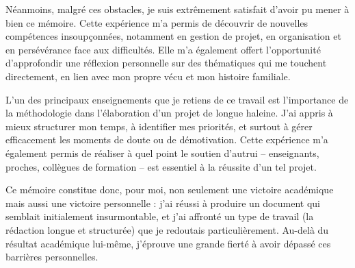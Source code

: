 \documentclass[11pt,a4paper]{report}
\begin{document}
Néanmoins, malgré ces obstacles, je suis extrêmement satisfait d’avoir pu mener à bien ce mémoire. Cette expérience m’a permis de découvrir de nouvelles compétences insoupçonnées, notamment en gestion de projet, en organisation et en persévérance face aux difficultés. Elle m’a également offert l’opportunité d’approfondir une réflexion personnelle sur des thématiques qui me touchent directement, en lien avec mon propre vécu et mon histoire familiale.

L’un des principaux enseignements que je retiens de ce travail est l’importance de la méthodologie dans l’élaboration d’un projet de longue haleine. J’ai appris à mieux structurer mon temps, à identifier mes priorités, et surtout à gérer efficacement les moments de doute ou de démotivation. Cette expérience m’a également permis de réaliser à quel point le soutien d’autrui – enseignants, proches, collègues de formation – est essentiel à la réussite d’un tel projet.

Ce mémoire constitue donc, pour moi, non seulement une victoire académique mais aussi une victoire personnelle : j’ai réussi à produire un document qui semblait initialement insurmontable, et j’ai affronté un type de travail (la rédaction longue et structurée) que je redoutais particulièrement. Au-delà du résultat académique lui-même, j’éprouve une grande fierté à avoir dépassé ces barrières personnelles.


\end{document}
